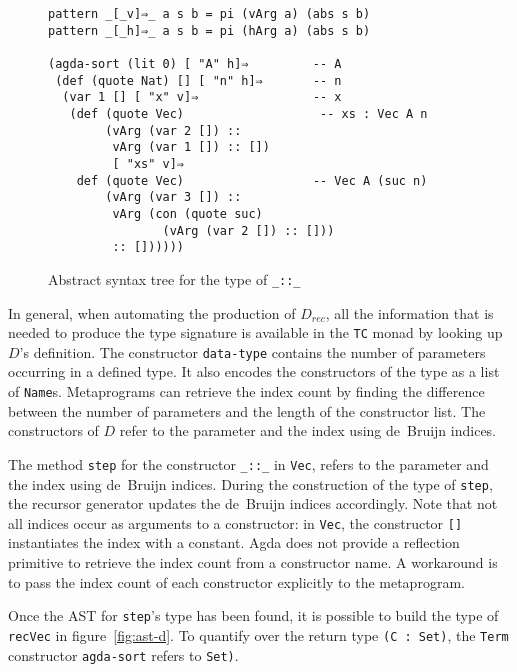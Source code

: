 \documentclass[sigplan,10pt]{acmart}
\begin{document}
\begin{figure}
\begin{center}
\begingroup
\fontsize{9pt}{10pt}\selectfont
\begin{Verbatim}
pattern _[_v]⇒_ a s b = pi (vArg a) (abs s b)
pattern _[_h]⇒_ a s b = pi (hArg a) (abs s b)

(agda-sort (lit 0) [ "A" h]⇒         -- A
 (def (quote Nat) [] [ "n" h]⇒       -- n
  (var 1 [] [ "x" v]⇒                -- x
   (def (quote Vec)                   -- xs : Vec A n
        (vArg (var 2 []) ::
         vArg (var 1 []) :: [])
         [ "xs" v]⇒
    def (quote Vec)                  -- Vec A (suc n)
        (vArg (var 3 []) ::
         vArg (con (quote suc)
                (vArg (var 2 []) :: []))
         :: [])))))
\end{Verbatim}
\endgroup
\end{center}
\caption{Abstract syntax tree for the type of {\tt \_::\_}}
\label{fig:ast-g}
\end{figure}
\normalsize

In general, when automating the production of $D_{\mathit{rec}}$, all the information that is needed to produce the type signature is available in the \texttt{TC} monad by looking up $D$'s definition.
The constructor {\tt data-type} contains the number of parameters occurring in a defined type. It also encodes the constructors of the type as a list of \texttt{Name}s. Metaprograms can retrieve the index count by finding the difference between the number of parameters and the length of the constructor list. The constructors of $D$ refer to the parameter and the index using de~Bruijn indices.

The method {\tt step} for the constructor {\tt \_::\_} in {\tt Vec}, refers to the parameter and the index using de~Bruijn indices.
During the construction of the type of {\tt step}, the recursor generator updates the de~Bruijn indices accordingly.
Note that not all indices occur as arguments to a constructor: in {\tt Vec}, the constructor {\tt []} instantiates the index with a constant.
Agda does not provide a reflection primitive to retrieve the index count from a constructor name.
A workaround is to pass the index count of each constructor explicitly to the metaprogram.

Once the AST for {\tt step}'s type has been found, it is possible to build the type of {\tt recVec} in figure~\ref{fig:ast-d}.
To quantify over the return type \texttt{(C : Set)}, the \texttt{Term} constructor \texttt{agda-sort} refers to \texttt{Set)}. 
\end{document}
